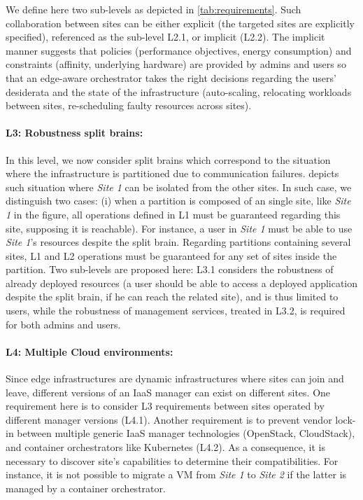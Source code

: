 We define here two sub-levels as depicted in \cref{tab:requirements}. Such
collaboration between sites can be either explicit (\ie the targeted sites are
explicitly specified), referenced as the sub-level L2.1, or implicit (L2.2).
The implicit manner suggests that policies (\eg performance objectives, energy
consumption) and constraints (\eg affinity, underlying hardware) are provided
by admins and users so that an edge-aware orchestrator takes the right
decisions regarding the users' desiderata and the state of the infrastructure
(\eg auto-scaling, relocating workloads between sites, re-scheduling faulty
resources across sites).

\paragraph{L3: Robustness \wrt split brains:}
In this level, we now consider split brains which correspond to the situation
where the infrastructure is partitioned due to communication failures.
 depicts such situation where \emph{Site 1} can be
isolated from the other sites. In such case, we distinguish two cases: (i) when
a partition is composed of an single site, like \emph{Site 1} in the figure,
all operations defined in L1 must be guaranteed regarding this site, supposing
it is reachable). For instance, a user in \emph{Site 1} must be
able to use \emph{Site 1}'s resources despite the split brain. Regarding
partitions containing several sites, L1 and L2 operations must be guaranteed
for any set of sites inside the partition.
Two sub-levels are proposed here: L3.1 considers the robustness of already
deployed resources (\eg a user should be able to access a deployed application
despite the split brain, if he can reach the related site), and is thus limited
to users, while the robustness of management services, treated in L3.2, is
required for both admins and users.

\paragraph{L4: Multiple Cloud environments:}
Since edge infrastructures are dynamic infrastructures where sites can join and
leave, different versions of an IaaS manager can exist on different sites. One
requirement here is to consider L3 requirements between sites operated by
different manager versions (L4.1). Another requirement is to prevent vendor
lock-in between multiple generic IaaS manager technologies (\eg OpenStack,
CloudStack), and container orchestrators like Kubernetes (L4.2).
As a consequence, it is necessary to discover site's capabilities to determine
their compatibilities. For instance, it is not possible to migrate a VM from
\emph{Site 1} to \emph{Site 2} if the latter is managed by a container
orchestrator.

